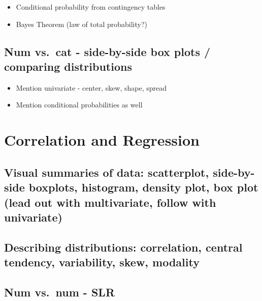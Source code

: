\documentclass[]{book}
\providecommand{\tightlist}{%
  \setlength{\itemsep}{0pt}\setlength{\parskip}{0pt}}
\begin{document}
\begin{itemize}
\tightlist
\item
  Conditional probability from contingency tables
\item
  Bayes Theorem (law of total probability?)
\end{itemize}

\hypertarget{num-vs.cat---side-by-side-box-plots-comparing-distributions}{%
\section{Num vs.~cat - side-by-side box plots / comparing distributions}\label{num-vs.cat---side-by-side-box-plots-comparing-distributions}}

\begin{itemize}
\tightlist
\item
  Mention univariate - center, skew, shape, spread
\item
  Mention conditional probabilities as well
\end{itemize}

\hypertarget{cor-reg}{%
\chapter{Correlation and Regression}\label{cor-reg}}

\hypertarget{visual-summaries-of-data-scatterplot-side-by-side-boxplots-histogram-density-plot-box-plot-lead-out-with-multivariate-follow-with-univariate}{%
\section{Visual summaries of data: scatterplot, side-by-side boxplots, histogram, density plot, box plot (lead out with multivariate, follow with univariate)}\label{visual-summaries-of-data-scatterplot-side-by-side-boxplots-histogram-density-plot-box-plot-lead-out-with-multivariate-follow-with-univariate}}

\hypertarget{describing-distributions-correlation-central-tendency-variability-skew-modality}{%
\section{Describing distributions: correlation, central tendency, variability, skew, modality}\label{describing-distributions-correlation-central-tendency-variability-skew-modality}}

\hypertarget{num-vs.num---slr}{%
\section{Num vs.~num - SLR}\label{num-vs.num---slr}}
\end{document}
